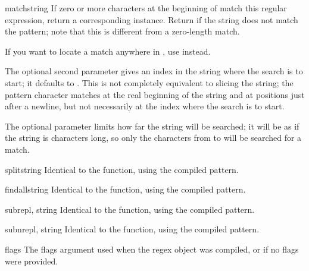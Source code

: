 \begin{methoddesc}[RegexObject]{match}{string}
  If zero or more characters at the beginning of  match
  this regular expression, return a corresponding
   instance.  Return  if the string does not
  match the pattern; note that this is different from a zero-length
  match.

    If you want to locate a match anywhere in
  , use  instead.

  The optional second parameter  gives an index in the string
  where the search is to start; it defaults to .  This is not
  completely equivalent to slicing the string; the  pattern
  character matches at the real beginning of the string and at positions
  just after a newline, but not necessarily at the index where the search
  is to start.

  The optional parameter  limits how far the string will
  be searched; it will be as if the string is  characters
  long, so only the characters from  to  will be
  searched for a match.
\end{methoddesc}

\begin{methoddesc}[RegexObject]{split}{string}
Identical to the  function, using the compiled pattern.
\end{methoddesc}

\begin{methoddesc}[RegexObject]{findall}{string}
Identical to the  function, using the compiled pattern.
\end{methoddesc}

\begin{methoddesc}[RegexObject]{sub}{repl, string}
Identical to the  function, using the compiled pattern.
\end{methoddesc}

\begin{methoddesc}[RegexObject]{subn}{repl, string}
Identical to the  function, using the compiled pattern.
\end{methoddesc}


\begin{memberdesc}[RegexObject]{flags}
The flags argument used when the regex object was compiled, or
 if no flags were provided.
\end{memberdesc}

